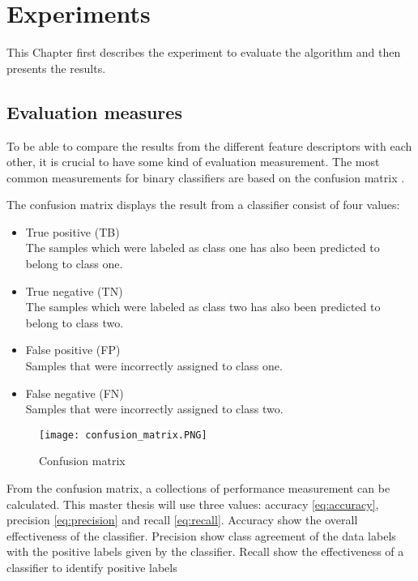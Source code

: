 \chapter{Experiments}\label{cha:result}

This Chapter first describes the experiment to evaluate the algorithm and then presents the results.

\section{Evaluation measures}

To be able to compare the results from the different feature descriptors with each other, it is crucial to have some kind of evaluation measurement. The most common measurements for binary classifiers are based on the confusion matrix \cite{sokolova2009systematic}. 

The confusion matrix displays the result from a classifier consist of four values:

\begin{itemize}
	\item True positive (TB)\\
	The samples which were labeled as class one has also been predicted to belong to class one.
	
	\item True negative (TN)\\
	The samples which were labeled as class two has also been predicted to belong to class two.
	
	\item False positive (FP)\\
	Samples that were incorrectly assigned to class one.
	
	\item False negative (FN)\\
	Samples that were incorrectly assigned to class two.
\end{itemize}

\FloatBarrier
\begin{figure}[!h]
	\centering
	\texttt{[image: confusion\_matrix.PNG]}
	\caption{Confusion matrix
		\label{fig:confusion}}
\end{figure} 
\FloatBarrier

From the confusion matrix, a collections of performance measurement can be calculated. This master thesis will use three values: accuracy \cref{eq:accuracy}, precision \cref{eq:precision} and recall \cref{eq:recall}. Accuracy show the overall effectiveness of the classifier. Precision show class agreement of the data labels with the positive labels given by the classifier. Recall show the effectiveness of a classifier to identify positive labels

